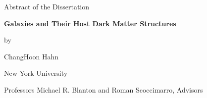 \documentclass[12pt,letterpaper]{article}
\newcommand{\thesistitle}{Galaxies and Their Host Dark Matter Structures}
\newcommand{\thesisauthor}{ChangHoon Hahn}
\newcommand{\thesisadvisor}{Professors Michael R. Blanton and Roman Scoccimarro}
\begin{document}
  \begin{center}
    Abstract of the Dissertation\bigskip

    \textbf{\thesistitle}\bigskip

    by\bigskip

    \thesisauthor\bigskip

    New York University\bigskip

    \thesisadvisor, Advisors
  \end{center}
\bigskip


\end{document}
